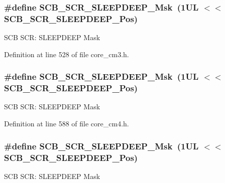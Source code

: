 \subsubsection[{\texorpdfstring{S\+C\+B\+\_\+\+S\+C\+R\+\_\+\+S\+L\+E\+E\+P\+D\+E\+E\+P\+\_\+\+Msk}{SCB_SCR_SLEEPDEEP_Msk}}]{\setlength{\rightskip}{0pt plus 5cm}\#define S\+C\+B\+\_\+\+S\+C\+R\+\_\+\+S\+L\+E\+E\+P\+D\+E\+E\+P\+\_\+\+Msk~(1\+U\+L $<$$<$ S\+C\+B\+\_\+\+S\+C\+R\+\_\+\+S\+L\+E\+E\+P\+D\+E\+E\+P\+\_\+\+Pos)}\hypertarget{group___c_m_s_i_s___s_c_b_ga77c06a69c63f4b3f6ec1032e911e18e7}{}\label{group___c_m_s_i_s___s_c_b_ga77c06a69c63f4b3f6ec1032e911e18e7}
S\+CB S\+CR\+: S\+L\+E\+E\+P\+D\+E\+EP Mask 

Definition at line 528 of file core\+\_\+cm3.\+h.

\subsubsection[{\texorpdfstring{S\+C\+B\+\_\+\+S\+C\+R\+\_\+\+S\+L\+E\+E\+P\+D\+E\+E\+P\+\_\+\+Msk}{SCB_SCR_SLEEPDEEP_Msk}}]{\setlength{\rightskip}{0pt plus 5cm}\#define S\+C\+B\+\_\+\+S\+C\+R\+\_\+\+S\+L\+E\+E\+P\+D\+E\+E\+P\+\_\+\+Msk~(1\+U\+L $<$$<$ S\+C\+B\+\_\+\+S\+C\+R\+\_\+\+S\+L\+E\+E\+P\+D\+E\+E\+P\+\_\+\+Pos)}\hypertarget{group___c_m_s_i_s___s_c_b_ga77c06a69c63f4b3f6ec1032e911e18e7}{}\label{group___c_m_s_i_s___s_c_b_ga77c06a69c63f4b3f6ec1032e911e18e7}
S\+CB S\+CR\+: S\+L\+E\+E\+P\+D\+E\+EP Mask 

Definition at line 588 of file core\+\_\+cm4.\+h.

\subsubsection[{\texorpdfstring{S\+C\+B\+\_\+\+S\+C\+R\+\_\+\+S\+L\+E\+E\+P\+D\+E\+E\+P\+\_\+\+Msk}{SCB_SCR_SLEEPDEEP_Msk}}]{\setlength{\rightskip}{0pt plus 5cm}\#define S\+C\+B\+\_\+\+S\+C\+R\+\_\+\+S\+L\+E\+E\+P\+D\+E\+E\+P\+\_\+\+Msk~(1\+U\+L $<$$<$ S\+C\+B\+\_\+\+S\+C\+R\+\_\+\+S\+L\+E\+E\+P\+D\+E\+E\+P\+\_\+\+Pos)}\hypertarget{group___c_m_s_i_s___s_c_b_ga77c06a69c63f4b3f6ec1032e911e18e7}{}\label{group___c_m_s_i_s___s_c_b_ga77c06a69c63f4b3f6ec1032e911e18e7}
S\+CB S\+CR\+: S\+L\+E\+E\+P\+D\+E\+EP Mask 

